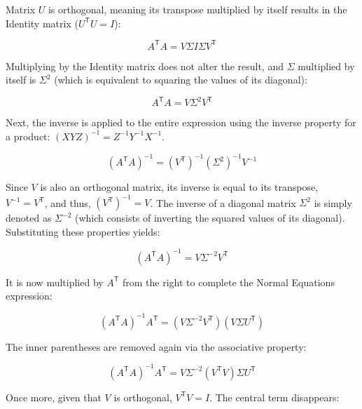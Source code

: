 \documentclass[11pt,a4paper]{article}
\newcommand{\trans}{\mathsf{T}}      %
\begin{document}
Matrix \(U\) is orthogonal, meaning its transpose multiplied by itself results in the Identity matrix (\(U^{\trans} U = I\)):

\begin{equation}
    A^{\trans} A = V \Sigma I \Sigma V^{\trans}
\end{equation}

Multiplying by the Identity matrix does not alter the result, and \(\Sigma\) multiplied by itself is \(\Sigma^2\) (which is equivalent to squaring the values of its diagonal):

\begin{equation}
    A^{\trans} A = V \Sigma^2 V^{\trans}
\end{equation}

Next, the inverse is applied to the entire expression using the inverse property for a product: \((X Y Z)^{-1} = Z^{-1} Y^{-1} X^{-1}\).

\begin{equation}
    (A^{\trans} A)^{-1} = (V^{\trans})^{-1} (\Sigma^2)^{-1} V^{-1}
\end{equation}

Since \(V\) is also an orthogonal matrix, its inverse is equal to its transpose, \(V^{-1} = V^{\trans}\), and thus, \((V^{\trans})^{-1} = V\). The inverse of a diagonal matrix \(\Sigma^2\) is simply denoted as \(\Sigma^{-2}\) (which consists of inverting the squared values of its diagonal). Substituting these properties yields:

\begin{equation}
    (A^{\trans} A)^{-1} = V \Sigma^{-2} V^{\trans}
\end{equation}

It is now multiplied by \(A^{\trans}\) from the right to complete the Normal Equations expression:

\begin{equation}
    (A^{\trans} A)^{-1} A^{\trans} = (V \Sigma^{-2} V^{\trans}) (V \Sigma U^{\trans})
\end{equation}

The inner parentheses are removed again via the associative property:

\begin{equation}
    (A^{\trans} A)^{-1} A^{\trans} = V \Sigma^{-2} (V^{\trans} V) \Sigma U^{\trans}
\end{equation}

Once more, given that \(V\) is orthogonal, \(V^{\trans} V = I\). The central term disappears:
\end{document}
